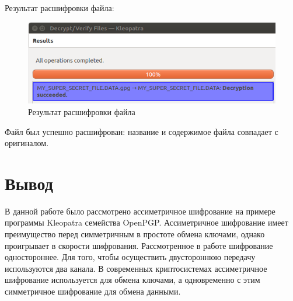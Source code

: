 \documentclass[14pt,a4paper,report]{report}
\begin{document}
Результат расшифровки файла:

\begin{figure}[h!]
	\centering
	\includegraphics[scale = 0.63]{images/1_8.png}
	
	\caption{Результат расшифровки файла}
	\label{image:12}
\end{figure}

Файл был успешно расшифрован: название и содержимое файла совпадает с оригиналом.

\section{Вывод}

В данной работе было рассмотрено ассиметричное шифрование на примере программы Kleopatra семейства OpenPGP. Ассиметричное шифрование имеет преимущество перед симметричным в простоте обмена ключами, однако проигрывает в скорости шифрования. Рассмотренное в работе шифрование одностороннее. Для того, чтобы осуществить двустороннюю передачу используются два канала. В современных криптосистемах ассиметричное шифрование используется для обмена ключами, а одновременно с этим симметричное шифрование для обмена данными.
\end{document}
